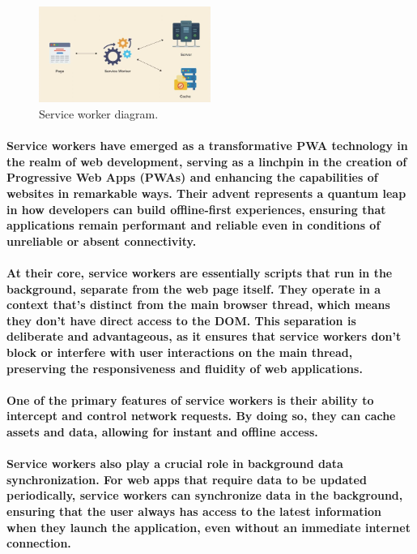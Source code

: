 \documentclass[12pt,a4paper]{article}
\begin{document}
    \begin{figure}[h!]
      \centering
      \includegraphics[width=0.5\textwidth]{serviceworker.png}
      \caption{Service worker diagram.}
    \end{figure}

    \paragraph{Service workers have emerged as a transformative PWA technology in the realm of web development, serving as a linchpin in the creation of Progressive Web Apps (PWAs) and enhancing the capabilities of websites in remarkable ways. Their advent represents a quantum leap in how developers can build offline-first experiences, ensuring that applications remain performant and reliable even in conditions of unreliable or absent connectivity.}
    
    \paragraph{At their core, service workers are essentially scripts that run in the background, separate from the web page itself. They operate in a context that’s distinct from the main browser thread, which means they don’t have direct access to the DOM. This separation is deliberate and advantageous, as it ensures that service workers don’t block or interfere with user interactions on the main thread, preserving the responsiveness and fluidity of web applications.}
    
    \paragraph{One of the primary features of service workers is their ability to intercept and control network requests. By doing so, they can cache assets and data, allowing for instant and offline access. }
    
    \paragraph{Service workers also play a crucial role in background data synchronization. For web apps that require data to be updated periodically, service workers can synchronize data in the background, ensuring that the user always has access to the latest information when they launch the application, even without an immediate internet connection.}
\end{document}
